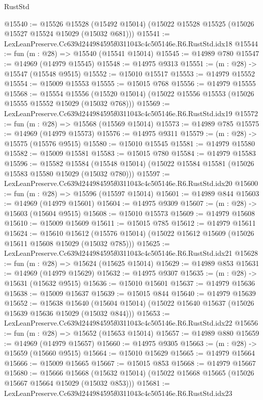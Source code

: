 \begin{lexlean}{RustStd}
\begin{coremodule}
@15540 := @15526
    @15528
    (@15492 @15014)
    (@15022 @15528 @15525 (@15026 @15527 @15524 @15029 (@15032 @681)))
@15541 := LexLeanPreserve.Cc639d244984595f0311043c4c505146e.R6.RustStd.idx18
@15544 := fun (m : @28) => @15540 (@15541 @15014)
@15545 := @14989 @780
@15547 := @14969 (@14979 @15545)
@15548 := @14975 @9313
@15551 := (m : @28) -> @15547 (@15548 @9515)
@15552 := @15010 @15517
@15553 := @14979 @15552
@15554 := @15009 @15553
@15555 := @15015 @768
@15556 := @14979 @15555
@15568 := @15554
    @15556
    (@15520 @15014)
    (@15022 @15556 @15553 (@15026 @15555 @15552 @15029 (@15032 @768)))
@15569 := LexLeanPreserve.Cc639d244984595f0311043c4c505146e.R6.RustStd.idx19
@15572 := fun (m : @28) => @15568 (@15569 @15014)
@15573 := @14989 @785
@15575 := @14969 (@14979 @15573)
@15576 := @14975 @9311
@15579 := (m : @28) -> @15575 (@15576 @9515)
@15580 := @15010 @15545
@15581 := @14979 @15580
@15582 := @15009 @15581
@15583 := @15015 @780
@15584 := @14979 @15583
@15596 := @15582
    @15584
    (@15548 @15014)
    (@15022 @15584 @15581 (@15026 @15583 @15580 @15029 (@15032 @780)))
@15597 := LexLeanPreserve.Cc639d244984595f0311043c4c505146e.R6.RustStd.idx20
@15600 := fun (m : @28) => @15596 (@15597 @15014)
@15601 := @14989 @844
@15603 := @14969 (@14979 @15601)
@15604 := @14975 @9309
@15607 := (m : @28) -> @15603 (@15604 @9515)
@15608 := @15010 @15573
@15609 := @14979 @15608
@15610 := @15009 @15609
@15611 := @15015 @785
@15612 := @14979 @15611
@15624 := @15610
    @15612
    (@15576 @15014)
    (@15022 @15612 @15609 (@15026 @15611 @15608 @15029 (@15032 @785)))
@15625 := LexLeanPreserve.Cc639d244984595f0311043c4c505146e.R6.RustStd.idx21
@15628 := fun (m : @28) => @15624 (@15625 @15014)
@15629 := @14989 @853
@15631 := @14969 (@14979 @15629)
@15632 := @14975 @9307
@15635 := (m : @28) -> @15631 (@15632 @9515)
@15636 := @15010 @15601
@15637 := @14979 @15636
@15638 := @15009 @15637
@15639 := @15015 @844
@15640 := @14979 @15639
@15652 := @15638
    @15640
    (@15604 @15014)
    (@15022 @15640 @15637 (@15026 @15639 @15636 @15029 (@15032 @844)))
@15653 := LexLeanPreserve.Cc639d244984595f0311043c4c505146e.R6.RustStd.idx22
@15656 := fun (m : @28) => @15652 (@15653 @15014)
@15657 := @14989 @880
@15659 := @14969 (@14979 @15657)
@15660 := @14975 @9305
@15663 := (m : @28) -> @15659 (@15660 @9515)
@15664 := @15010 @15629
@15665 := @14979 @15664
@15666 := @15009 @15665
@15667 := @15015 @853
@15668 := @14979 @15667
@15680 := @15666
    @15668
    (@15632 @15014)
    (@15022 @15668 @15665 (@15026 @15667 @15664 @15029 (@15032 @853)))
@15681 := LexLeanPreserve.Cc639d244984595f0311043c4c505146e.R6.RustStd.idx23

\end{coremodule}
\end{lexlean}
